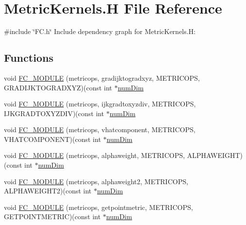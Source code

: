 \hypertarget{MetricKernels_8H}{}\section{Metric\+Kernels.\+H File Reference}
\label{MetricKernels_8H}
{\ttfamily \#include \char`\"{}F\+C.\+h\char`\"{}}\newline
Include dependency graph for Metric\+Kernels.\+H\+:
\subsection*{Functions}
\begin{DoxyCompactItemize}
\item 
void \hyperlink{MetricKernels_8H_a408bdb411cce4c06263985037eeeb27a}{F\+C\+\_\+\+M\+O\+D\+U\+LE} (metricops, gradijktogradxyz, M\+E\+T\+R\+I\+C\+O\+PS, G\+R\+A\+D\+I\+J\+K\+T\+O\+G\+R\+A\+D\+X\+YZ)(const int $\ast$\hyperlink{SATKernels_8H_a680185db8546de161968dabace9e94f1}{num\+Dim}
\item 
void \hyperlink{MetricKernels_8H_af644bbd091c4c780a0be0983db826050}{F\+C\+\_\+\+M\+O\+D\+U\+LE} (metricops, ijkgradtoxyzdiv, M\+E\+T\+R\+I\+C\+O\+PS, I\+J\+K\+G\+R\+A\+D\+T\+O\+X\+Y\+Z\+D\+IV)(const int $\ast$\hyperlink{SATKernels_8H_a680185db8546de161968dabace9e94f1}{num\+Dim}
\item 
void \hyperlink{MetricKernels_8H_aadbfd79fe9034c2b7d9388e7ab204206}{F\+C\+\_\+\+M\+O\+D\+U\+LE} (metricops, vhatcomponent, M\+E\+T\+R\+I\+C\+O\+PS, V\+H\+A\+T\+C\+O\+M\+P\+O\+N\+E\+NT)(const int $\ast$\hyperlink{SATKernels_8H_a680185db8546de161968dabace9e94f1}{num\+Dim}
\item 
void \hyperlink{MetricKernels_8H_a9810c6ee80b4988b0d27c33fc8983de1}{F\+C\+\_\+\+M\+O\+D\+U\+LE} (metricops, alphaweight, M\+E\+T\+R\+I\+C\+O\+PS, A\+L\+P\+H\+A\+W\+E\+I\+G\+HT)(const int $\ast$\hyperlink{SATKernels_8H_a680185db8546de161968dabace9e94f1}{num\+Dim}
\item 
void \hyperlink{MetricKernels_8H_a368f9afed7127d95485d857012fd6540}{F\+C\+\_\+\+M\+O\+D\+U\+LE} (metricops, alphaweight2, M\+E\+T\+R\+I\+C\+O\+PS, A\+L\+P\+H\+A\+W\+E\+I\+G\+H\+T2)(const int $\ast$\hyperlink{SATKernels_8H_a680185db8546de161968dabace9e94f1}{num\+Dim}
\item 
void \hyperlink{MetricKernels_8H_a53a962e4c1ac44c605d66ed908add815}{F\+C\+\_\+\+M\+O\+D\+U\+LE} (metricops, getpointmetric, M\+E\+T\+R\+I\+C\+O\+PS, G\+E\+T\+P\+O\+I\+N\+T\+M\+E\+T\+R\+IC)(const int $\ast$\hyperlink{SATKernels_8H_a680185db8546de161968dabace9e94f1}{num\+Dim}

\end{DoxyCompactItemize}
